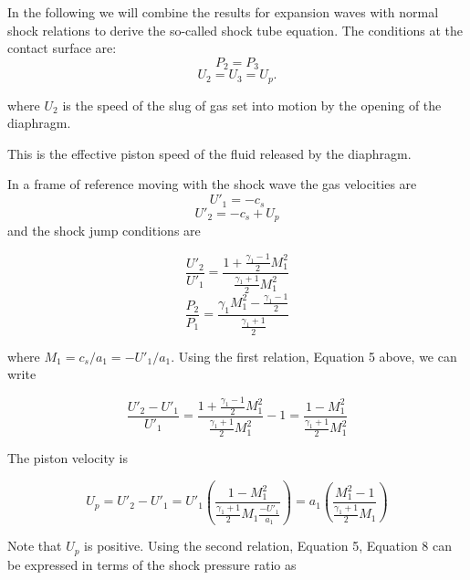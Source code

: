 In the following we will combine the results for expansion waves with normal shock relations to derive the so-called shock tube equation. The conditions at the contact surface are:
\begin{equation}
	P_2 = P_3 
\end{equation}
\begin{equation}
	U_2 = U_3 = U_p.
\end{equation}
\begin{center}
	where $U_2$ is the speed of the slug of gas set into motion by the opening of the diaphragm.
\end{center}
This is the effective piston speed of the fluid released by the diaphragm.

In a frame of reference moving with the shock wave the gas velocities are
\begin{equation}
U'_1 = -c_s
\end{equation}
\begin{equation}
U'_2 = -c_s + U_p
\end{equation}
and the shock jump conditions are

\begin{equation}
\frac{U'_2}{U'_1} = \frac{1+\frac{\gamma_1-1}{2}M_1^2}{\frac{\gamma_1+1}{2}M_1^2} 
\end{equation}
\begin{equation}
\frac{P_2}{P_1} = \frac{\gamma_1M_1^2-\frac{\gamma_1-1}{2}}{\frac{\gamma_1+1}{2}} 
\end{equation}
\begin{center}
	where $M_1 = c_s/a_1 = -U'_1/a_1$. Using the first relation, Equation 5 above, we can write
\end{center}

\begin{equation}
\frac{U'_2 - U'_1}{U'_1} = \frac{1 + \frac{\gamma_1-1}{2}M_1^2}{\frac{\gamma_1+1}{2}M_1^2} - 1 = \frac{1 - M_1^2}{\frac{\gamma_1+1}{2}M_1^2}
\end{equation}

The piston velocity is

\begin{equation}
U_p = U'_2 - U'_1 = U'_1\left(\frac{1 - M_1^2}{\frac{\gamma_1+1}{2}M_1\frac{-U'_1}{a_1}}\right) = a_1\left(\frac{M_1^2 - 1}{\frac{\gamma_1+1}{2}M_1}\right) 
\end{equation}

Note that $U_p$ is positive. Using the second relation, Equation 5, Equation 8 can be expressed in terms of the shock pressure ratio as 

